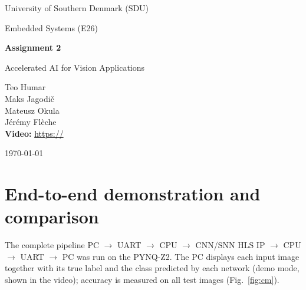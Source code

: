 \documentclass[11pt,a4paper]{article}
\begin{document}
\begin{titlepage}
\centering
\vspace*{2cm}
{\large University of Southern Denmark (SDU)\par}
\vspace{0.5cm}
{\large Embedded Systems (E26)\par}
\vspace{2cm}
{\huge\bfseries Assignment 2\par}
\vspace{0.5cm}
{\Large Accelerated AI for Vision Applications\par}
\vspace{2cm}
\vspace{0.5cm}
Teo Humar\\
Maks Jagodič\\
Mateusz Okula\\
Jérémy Flèche\\
\vspace{2cm}
\textbf{Video:} \url{https://}\par
\vfill
{\large \today\par}
\end{titlepage}

\section{}

\section{}

\section{}

\section{End-to-end demonstration and comparison}

The complete pipeline PC $\rightarrow$ UART $\rightarrow$ CPU $\rightarrow$ CNN/SNN HLS IP
$\rightarrow$ CPU $\rightarrow$ UART $\rightarrow$ PC was run on the PYNQ-Z2. The PC displays
each input image together with its true label and the class predicted by each network (demo
mode, shown in the video); accuracy is measured on all test images (Fig.~\ref{fig:cm}).
\end{document}
